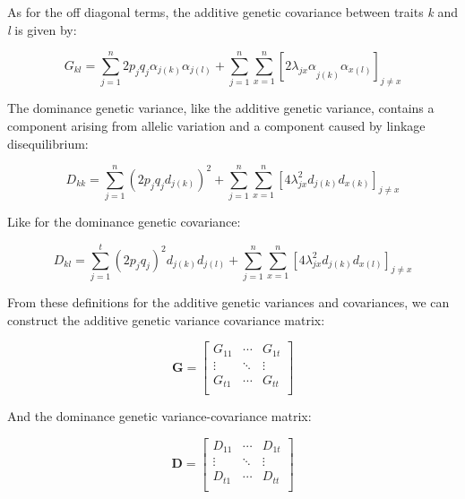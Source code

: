 \begin{refsection}
As for the off diagonal terms, the additive genetic covariance between
traits \emph{k} and \emph{l} is given by:

\begin{equation}
G_{kl} = \sum_{j=1}^n 2p_{j}q_{j}\alpha_{j(k)}\alpha_{j(l)} + \sum_{j=1}^n \sum_{x=1}^n \left\lbrack {2\lambda_{jx}\alpha}_{j(k)}\alpha_{x(l)} \right\rbrack_{j \neq x}
\end{equation}

The dominance genetic variance, like the additive genetic variance,
contains a component arising from allelic variation and a component
caused by linkage disequilibrium:

\begin{equation}
D_{kk} = \sum_{j=1}^n \left( 2p_{j}q_{j}d_{j(k)} \right)^{2} + \sum_{j=1}^n \sum_{x=1}^n \left\lbrack 4\lambda_{jx}^{2}d_{j(k)}d_{x(k)} \right\rbrack_{j \neq x}
\end{equation}

Like for the dominance genetic covariance:

\begin{equation}
D_{kl} = \sum_{j = 1}^{t}{\left( 2p_{j}q_{j} \right)^{2}d_{j(k)}d_{j(l)} + \sum_{j = 1}^{n}{\sum_{x = 1}^{n}{\left\lbrack 4\lambda_{jx}^{2}d_{j(k)}d_{x(l)} \right\rbrack_{j \neq x}}}}
\end{equation}


From these definitions for the additive genetic variances and
covariances, we can construct the additive genetic variance covariance
matrix:

\begin{equation}
\mathbf{G} = \begin{bmatrix}
G_{11} & \cdots & G_{1t} \\
 \vdots & \ddots & \vdots \\
G_{t1} & \cdots & G_{tt} \\
\end{bmatrix}
\end{equation}

And the dominance genetic variance-covariance matrix:

\begin{equation}
\mathbf{D} = \begin{bmatrix}
D_{11} & \cdots & D_{1t} \\
 \vdots & \ddots & \vdots \\
D_{t1} & \cdots & D_{tt} \\
\end{bmatrix}
\end{equation}


\end{refsection}
